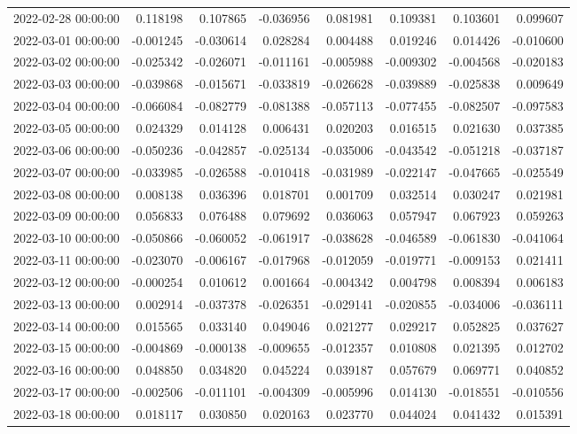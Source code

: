 \begin{tabular}{lrrrrrrr}
2022-02-28 00:00:00 & 0.118198 & 0.107865 & -0.036956 & 0.081981 & 0.109381 & 0.103601 & 0.099607 \\
2022-03-01 00:00:00 & -0.001245 & -0.030614 & 0.028284 & 0.004488 & 0.019246 & 0.014426 & -0.010600 \\
2022-03-02 00:00:00 & -0.025342 & -0.026071 & -0.011161 & -0.005988 & -0.009302 & -0.004568 & -0.020183 \\
2022-03-03 00:00:00 & -0.039868 & -0.015671 & -0.033819 & -0.026628 & -0.039889 & -0.025838 & 0.009649 \\
2022-03-04 00:00:00 & -0.066084 & -0.082779 & -0.081388 & -0.057113 & -0.077455 & -0.082507 & -0.097583 \\
2022-03-05 00:00:00 & 0.024329 & 0.014128 & 0.006431 & 0.020203 & 0.016515 & 0.021630 & 0.037385 \\
2022-03-06 00:00:00 & -0.050236 & -0.042857 & -0.025134 & -0.035006 & -0.043542 & -0.051218 & -0.037187 \\
2022-03-07 00:00:00 & -0.033985 & -0.026588 & -0.010418 & -0.031989 & -0.022147 & -0.047665 & -0.025549 \\
2022-03-08 00:00:00 & 0.008138 & 0.036396 & 0.018701 & 0.001709 & 0.032514 & 0.030247 & 0.021981 \\
2022-03-09 00:00:00 & 0.056833 & 0.076488 & 0.079692 & 0.036063 & 0.057947 & 0.067923 & 0.059263 \\
2022-03-10 00:00:00 & -0.050866 & -0.060052 & -0.061917 & -0.038628 & -0.046589 & -0.061830 & -0.041064 \\
2022-03-11 00:00:00 & -0.023070 & -0.006167 & -0.017968 & -0.012059 & -0.019771 & -0.009153 & 0.021411 \\
2022-03-12 00:00:00 & -0.000254 & 0.010612 & 0.001664 & -0.004342 & 0.004798 & 0.008394 & 0.006183 \\
2022-03-13 00:00:00 & 0.002914 & -0.037378 & -0.026351 & -0.029141 & -0.020855 & -0.034006 & -0.036111 \\
2022-03-14 00:00:00 & 0.015565 & 0.033140 & 0.049046 & 0.021277 & 0.029217 & 0.052825 & 0.037627 \\
2022-03-15 00:00:00 & -0.004869 & -0.000138 & -0.009655 & -0.012357 & 0.010808 & 0.021395 & 0.012702 \\
2022-03-16 00:00:00 & 0.048850 & 0.034820 & 0.045224 & 0.039187 & 0.057679 & 0.069771 & 0.040852 \\
2022-03-17 00:00:00 & -0.002506 & -0.011101 & -0.004309 & -0.005996 & 0.014130 & -0.018551 & -0.010556 \\
2022-03-18 00:00:00 & 0.018117 & 0.030850 & 0.020163 & 0.023770 & 0.044024 & 0.041432 & 0.015391 \\

\end{tabular}
